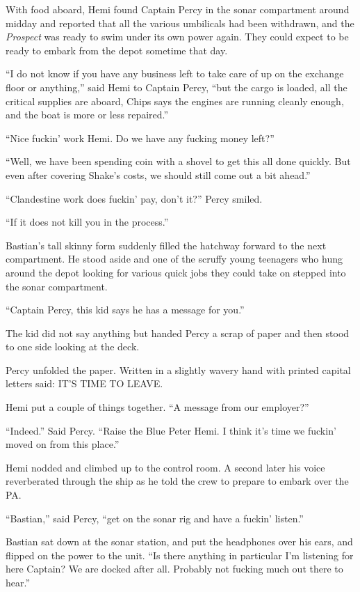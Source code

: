 \documentclass[]{scrbook}
\begin{document}
With food aboard, Hemi found Captain Percy in the sonar compartment
around midday and reported that all the various umbilicals had been
withdrawn, and the \emph{Prospect} was ready to swim under its own power
again. They could expect to be ready to embark from the depot sometime
that day.

``I do not know if you have any business left to take care of up on the
exchange floor or anything,'' said Hemi to Captain Percy, ``but the
cargo is loaded, all the critical supplies are aboard, Chips says the
engines are running cleanly enough, and the boat is more or less
repaired.''

``Nice fuckin' work Hemi. Do we have any fucking money left?''

``Well, we have been spending coin with a shovel to get this all done
quickly. But even after covering Shake's costs, we should still come out
a bit ahead.''

``Clandestine work does fuckin' pay, don't it?'' Percy smiled.

``If it does not kill you in the process.''

Bastian's tall skinny form suddenly filled the hatchway forward to the
next compartment. He stood aside and one of the scruffy young teenagers
who hung around the depot looking for various quick jobs they could take
on stepped into the sonar compartment.

``Captain Percy, this kid says he has a message for you.''

The kid did not say anything but handed Percy a scrap of paper and then
stood to one side looking at the deck.

Percy unfolded the paper. Written in a slightly wavery hand with printed
capital letters said: IT'S TIME TO LEAVE.

Hemi put a couple of things together. ``A message from our employer?''

``Indeed.'' Said Percy. ``Raise the Blue Peter Hemi. I think it's time
we fuckin' moved on from this place.''

Hemi nodded and climbed up to the control room. A second later his voice
reverberated through the ship as he told the crew to prepare to embark
over the PA.

``Bastian,'' said Percy, ``get on the sonar rig and have a fuckin'
listen.''

Bastian sat down at the sonar station, and put the headphones over his
ears, and flipped on the power to the unit. ``Is there anything in
particular I'm listening for here Captain? We are docked after all.
Probably not fucking much out there to hear.''
\end{document}
